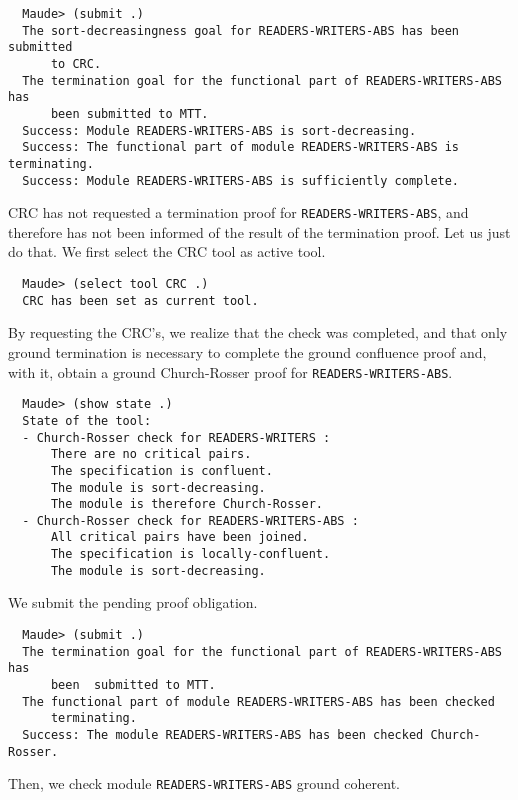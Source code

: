 \begin{small}
\begin{verbatim}
  Maude> (submit .)
  The sort-decreasingness goal for READERS-WRITERS-ABS has been submitted 
      to CRC.
  The termination goal for the functional part of READERS-WRITERS-ABS has      
      been submitted to MTT.
  Success: Module READERS-WRITERS-ABS is sort-decreasing.
  Success: The functional part of module READERS-WRITERS-ABS is terminating.
  Success: Module READERS-WRITERS-ABS is sufficiently complete.
\end{verbatim}
\end{small}
%
CRC has not requested a termination proof for \texttt{READERS-WRITERS-ABS}, and therefore has not been informed of the result of the termination proof. Let us just do that. We first select the CRC tool as active tool.

\begin{small}
\begin{verbatim}
  Maude> (select tool CRC .)
  CRC has been set as current tool.
\end{verbatim}
\end{small}
%
By requesting the CRC's, we realize that the check was completed, and that 
only ground termination is necessary to complete the ground confluence proof 
and, with it, obtain a ground Church-Rosser proof for \texttt{READERS-WRITERS-ABS}.

\begin{small}
\begin{verbatim}
  Maude> (show state .)
  State of the tool:
  - Church-Rosser check for READERS-WRITERS :
      There are no critical pairs.
      The specification is confluent.
      The module is sort-decreasing.
      The module is therefore Church-Rosser.
  - Church-Rosser check for READERS-WRITERS-ABS :
      All critical pairs have been joined.
      The specification is locally-confluent.
      The module is sort-decreasing.
\end{verbatim}
\end{small}
%
We submit the pending proof obligation. 

\begin{small}
\begin{verbatim}
  Maude> (submit .)
  The termination goal for the functional part of READERS-WRITERS-ABS has
      been  submitted to MTT.
  The functional part of module READERS-WRITERS-ABS has been checked 
      terminating.
  Success: The module READERS-WRITERS-ABS has been checked Church-Rosser.
\end{verbatim}
\end{small}
%
Then, we check module \verb~READERS-WRITERS-ABS~ ground coherent.

